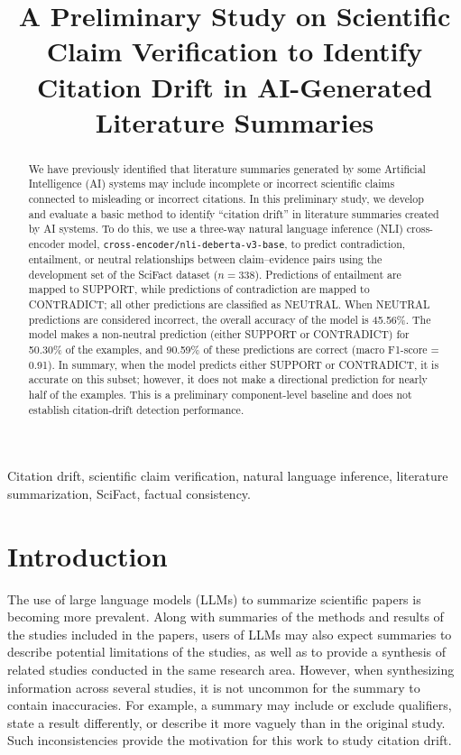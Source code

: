 \documentclass[conference]{IEEEtran}
\title{A Preliminary Study on Scientific Claim Verification to Identify Citation Drift in AI-Generated Literature Summaries}
\author{
\IEEEauthorblockN{[Author Name]}
\IEEEauthorblockA{
[Department / School]\\
[Institution]\\
[City, Country]\\
[Email Address]
}
}
\begin{document}
\maketitle

\begin{abstract}
We have previously identified that literature summaries generated by some Artificial Intelligence (AI) systems may include incomplete or incorrect scientific claims connected to misleading or incorrect citations. In this preliminary study, we develop and evaluate a basic method to identify ``citation drift'' in literature summaries created by AI systems. To do this, we use a three-way natural language inference (NLI) cross-encoder model, \texttt{cross-encoder/nli-deberta-v3-base}, to predict contradiction, entailment, or neutral relationships between claim--evidence pairs using the development set of the SciFact dataset ($n=338$). Predictions of entailment are mapped to SUPPORT, while predictions of contradiction are mapped to CONTRADICT; all other predictions are classified as NEUTRAL. When NEUTRAL predictions are considered incorrect, the overall accuracy of the model is 45.56\%. The model makes a non-neutral prediction (either SUPPORT or CONTRADICT) for 50.30\% of the examples, and 90.59\% of these predictions are correct (macro F1-score = 0.91). In summary, when the model predicts either SUPPORT or CONTRADICT, it is accurate on this subset; however, it does not make a directional prediction for nearly half of the examples. This is a preliminary component-level baseline and does not establish citation-drift detection performance.
\end{abstract}

\begin{IEEEkeywords}
Citation drift, scientific claim verification, natural language inference, literature summarization, SciFact, factual consistency.
\end{IEEEkeywords}

\section{Introduction}
The use of large language models (LLMs) to summarize scientific papers is becoming more prevalent. Along with summaries of the methods and results of the studies included in the papers, users of LLMs may also expect summaries to describe potential limitations of the studies, as well as to provide a synthesis of related studies conducted in the same research area. However, when synthesizing information across several studies, it is not uncommon for the summary to contain inaccuracies. For example, a summary may include or exclude qualifiers, state a result differently, or describe it more vaguely than in the original study. Such inconsistencies provide the motivation for this work to study citation drift.
\end{document}
